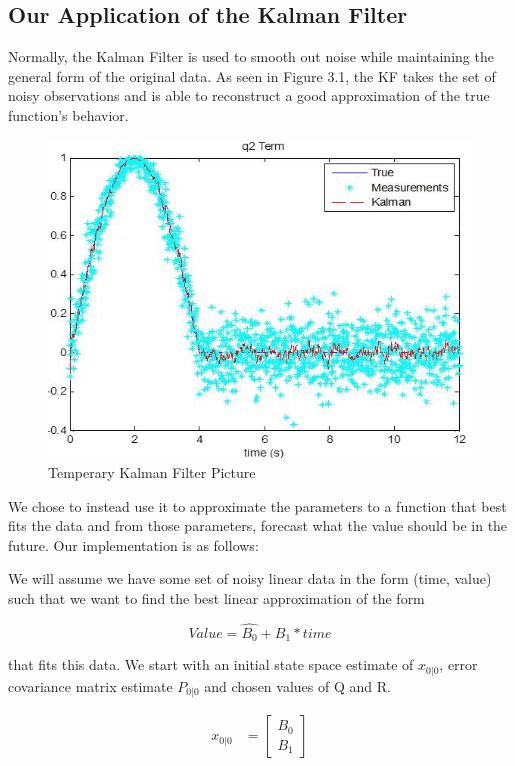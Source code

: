 \subsection{Our Application of the Kalman Filter}
Normally, the Kalman Filter is used to smooth out noise while maintaining the general form of the original data. As seen in Figure 3.1, the KF takes the set of noisy observations and is able to reconstruct a good approximation of the true function's behavior.

\begin{figure}[h]
\centering
\includegraphics{body/methodology/q2_kalman.jpg}
\caption{Temperary Kalman Filter Picture}
\end{figure}

 We chose to instead use it to approximate the parameters to a function that best fits the data and from those parameters, forecast what the value should be in the future. Our implementation is as follows:

We will assume we have some set of noisy linear data in the form (time, value) such that we want to find the best linear approximation of the form 

\begin{equation} 
Value = \hat{B_{0}} + \hat{B_{1}}*time  
\end{equation}

that fits this data. We start with an initial state space estimate of $x_{0|0}$, error covariance matrix estimate $P_{0|0}$ and chosen values of Q and R.

\begin{align}
    x_{0|0} &= \begin{bmatrix}
           B_{0} \\
           B_{1}
         \end{bmatrix}
  \end{align}
  
